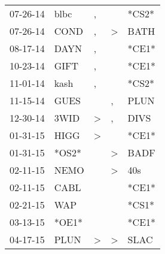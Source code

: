 \begin{supertabular}{p{0.07\textwidth}p{0.06\textwidth}p{0.02\textwidth}p{0.02\textwidth}p{0.06\textwidth}}
          07-26-14\textsuperscript{} &           blbc\textsuperscript{} &                , &                  &                            *CS2* \\
          07-26-14\textsuperscript{} &           COND\textsuperscript{} &                , &     \textgreater &           BATH\textsuperscript{} \\
          08-17-14\textsuperscript{} &           DAYN\textsuperscript{} &                , &                  &                            *CE1* \\
          10-23-14\textsuperscript{} &           GIFT\textsuperscript{} &                , &                  &                            *CE1* \\
          11-01-14\textsuperscript{} &           kash\textsuperscript{} &                , &                  &                            *CS2* \\
          11-15-14\textsuperscript{} &           GUES\textsuperscript{} &                  &                , &           PLUN\textsuperscript{} \\
          12-30-14\textsuperscript{} &           3WID\textsuperscript{} &     \textgreater &                , &           DIVS\textsuperscript{} \\
          01-31-15\textsuperscript{} &           HIGG\textsuperscript{} &     \textgreater &                  &                            *CE1* \\
          01-31-15\textsuperscript{} &                            *OS2* &                  &     \textgreater &           BADF\textsuperscript{} \\
          02-11-15\textsuperscript{} &           NEMO\textsuperscript{} &                  &     \textgreater &            40s\textsuperscript{} \\
          02-11-15\textsuperscript{} &           CABL\textsuperscript{} &                  &                  &                            *CE1* \\
          02-21-15\textsuperscript{} &            WAP\textsuperscript{} &                  &                  &                            *CS1* \\
          03-13-15\textsuperscript{} &                            *OE1* &                  &                  &                            *CE1* \\
          04-17-15\textsuperscript{} &           PLUN\textsuperscript{} &     \textgreater &     \textgreater &           SLAC\textsuperscript{} \\

\end{supertabular}
